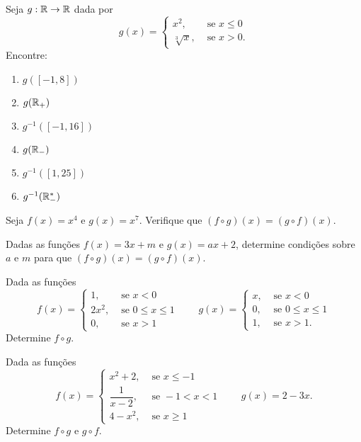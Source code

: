 \documentclass[12pt]{article}
\begin{document}
\questao Seja $g : \mathbb{R} \to \mathbb{R}$ dada por
\[
	g(x) = \begin{cases}
		x^2,& \mbox{ se } x \le 0\\
		\sqrt[3]{x}, & \mbox{ se } x > 0.
	\end{cases}
\]
Encontre:
\begin{multicols}{2}
	\begin{enumerate}[label={\alph*})]
		\item $g([-1,8])$
		\item $g(\mathbb{R}_+)$
		\item $g^{-1}([-1,16])$
		\item $g(\mathbb{R}_-)$
		\item $g^{-1}([1,25])$
		\item $g^{-1}(\mathbb{R}^*_-)$
	\end{enumerate}	
\end{multicols}


\vesp

\questao Seja $f(x) = x^4$ e $g(x) = x^7$. Verifique que $(f\circ g)(x) = (g\circ f)(x)$.

\vesp

\questao Dadas as funções $f(x) = 3x + m$ e $g(x) = ax + 2$, determine condições sobre $a$ e $m$ para que $(f\circ g)(x) = (g\circ f)(x)$.

\vesp

\questao Dada as funções
\[
	f(x) = \begin{cases}
		1, & \mbox{ se } x < 0\\
		2x^2, & \mbox{ se } 0 \le x \le 1\\
		0, & \mbox{ se } x > 1
	\end{cases} \qquad g(x) = \begin{cases}
		x, & \mbox{ se } x < 0\\
		0, & \mbox{ se } 0 \le x \le 1\\
		1, & \mbox{ se } x > 1.
	\end{cases}
\]
Determine $f\circ g$.

\vesp

\questao Dada as funções
\[
	f(x) = \begin{cases}
		x^2 + 2, & \mbox{ se } x \le -1\\
		\dfrac{1}{x - 2}, & \mbox{ se } -1 < x < 1\\
		4 - x^2, & \mbox{ se } x \ge 1
	\end{cases} \qquad g(x) = 2 - 3x.
\]
Determine $f\circ g$ e $g \circ f$.

\vesp
\end{document}
